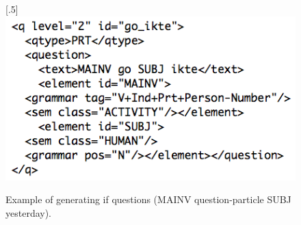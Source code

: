 \documentclass[11pt]{article}
\begin{document}
\begin{figure}[htbp]
\begin{center}
\scalebox{.5}[.5]{\includegraphics{presentation/img/question_vasta2.png}}\\
\caption{Example of generating if questions (MAINV question-particle SUBJ yesterday).}
\label{questionv}
\end{center}
\end{figure}

%
\end{document}
